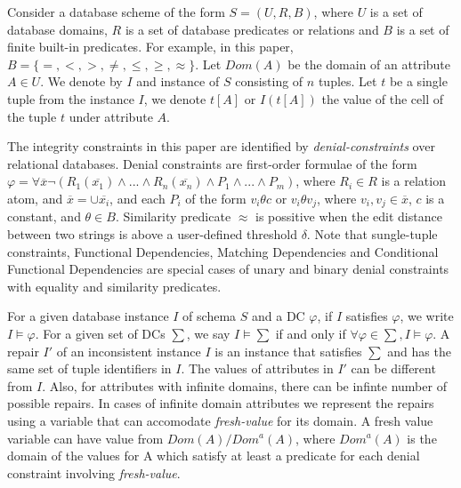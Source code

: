 Consider a database scheme of the form $S = (U, R, B)$, where $U$ is a set of database domains, $R$ is a set of database predicates or relations and $B$ is a set of finite built-in predicates.
For example, in this paper, $B = \{=, <, >, \neq, \leq, \geq, \approx\}$.
Let $Dom(A)$ be the domain of an attribute $A \in U$.
We denote by $I$ and instance of $S$ consisting of $n$ tuples.
Let $t$ be a single tuple from the instance $I$, we denote $t[A]$ or $I(t[A])$ the value of the cell of the tuple $t$ under attribute $A$.

The integrity constraints in this paper are identified by \textit{denial-constraints} over relational databases.
Denial constraints are first-order formulae of the form $ \varphi = \forall \overline{x}\neg(R_1(\overline{x_1}) \wedge ... \wedge R_n(\overline{x_n}) \wedge P_1 \wedge ... \wedge P_m)$,
where $R_i \in R$ is a relation atom, and $\overline{x} = \cup \overline{x_i}$, and each $P_i$ of the form $v_i \theta c$ or $v_i \theta v_j$, where $v_i, v_j \in \overline{x}$, $c$ is a constant,
and $\theta \in B$.
Similarity predicate $\approx$ is possitive when the edit distance between two strings is above a user-defined threshold $\delta$.
Note that sungle-tuple constraints, Functional Dependencies, Matching Dependencies and Conditional Functional Dependencies are special cases of 
unary and binary denial constraints with equality and similarity predicates.

For a given database instance $I$ of schema $S$ and a DC $\varphi$, if $I$ satisfies $\varphi$, we write $I \models \varphi$.
For a given set of DCs $\sum$, we say $I \models \sum$ if and only if $\forall \varphi \in \sum, I \models \varphi$.
A repair $I'$ of an inconsistent instance $I$ is an instance that satisfies $\sum$ and has the same set of tuple identifiers in $I$.
The values of attributes in $I'$ can be different from $I$.
Also, for attributes with infinite domains, there can be infinte number of possible repairs.
In cases of infinite domain attributes we represent the repairs using a variable that can accomodate \textit{fresh-value} for its domain.
A fresh value variable can have value from $Dom(A)/Dom^a(A)$, where $Dom^a(A)$ is the domain of the values for A which satisfy at least a predicate for each denial constraint involving \textit{fresh-value}.


